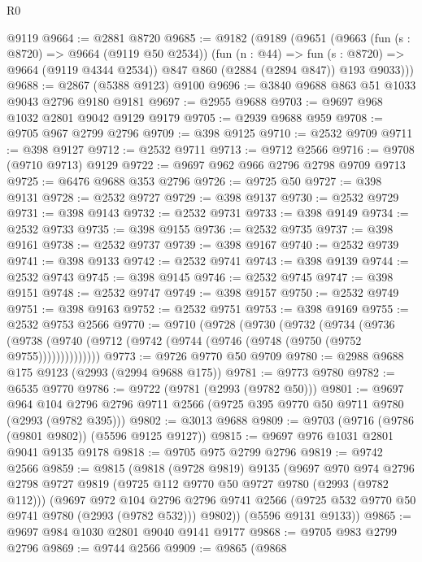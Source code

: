 \begin{lexlean}{R0}
\begin{coremodule}
    @9119
@9664 := @2881 @8720
@9685 := @9182
    (@9189
      (@9651
        (@9663
          (fun (s : @8720) => @9664 (@9119 @50 @2534))
          (fun (n : @44) => fun (s : @8720) => @9664 (@9119 @4344 @2534))
          @847
          @860
          (@2884 (@2894 @847))
          @193
          @9033)))
@9688 := @2867 (@5388 @9123) @9100
@9696 := @3840 @9688 @863 @51 @1033 @9043 @2796 @9180 @9181
@9697 := @2955 @9688
@9703 := @9697 @968 @1032 @2801 @9042 @9129 @9179
@9705 := @2939 @9688 @959
@9708 := @9705 @967 @2799 @2796
@9709 := @398 @9125
@9710 := @2532 @9709
@9711 := @398 @9127
@9712 := @2532 @9711
@9713 := @9712 @2566
@9716 := @9708 (@9710 @9713) @9129
@9722 := @9697 @962 @966 @2796 @2798 @9709 @9713
@9725 := @6476 @9688 @353 @2796
@9726 := @9725 @50
@9727 := @398 @9131
@9728 := @2532 @9727
@9729 := @398 @9137
@9730 := @2532 @9729
@9731 := @398 @9143
@9732 := @2532 @9731
@9733 := @398 @9149
@9734 := @2532 @9733
@9735 := @398 @9155
@9736 := @2532 @9735
@9737 := @398 @9161
@9738 := @2532 @9737
@9739 := @398 @9167
@9740 := @2532 @9739
@9741 := @398 @9133
@9742 := @2532 @9741
@9743 := @398 @9139
@9744 := @2532 @9743
@9745 := @398 @9145
@9746 := @2532 @9745
@9747 := @398 @9151
@9748 := @2532 @9747
@9749 := @398 @9157
@9750 := @2532 @9749
@9751 := @398 @9163
@9752 := @2532 @9751
@9753 := @398 @9169
@9755 := @2532 @9753 @2566
@9770 := @9710
    (@9728
      (@9730
        (@9732
          (@9734
            (@9736
              (@9738 (@9740 (@9712 (@9742 (@9744 (@9746 (@9748 (@9750 (@9752 @9755))))))))))))))
@9773 := @9726 @9770 @50 @9709
@9780 := @2988 @9688 @175 @9123 (@2993 (@2994 @9688 @175))
@9781 := @9773 @9780
@9782 := @6535 @9770
@9786 := @9722 (@9781 (@2993 (@9782 @50)))
@9801 := @9697
    @964
    @104
    @2796
    @2796
    @9711
    @2566
    (@9725 @395 @9770 @50 @9711 @9780 (@2993 (@9782 @395)))
@9802 := @3013 @9688
@9809 := @9703 (@9716 (@9786 (@9801 @9802)) (@5596 @9125 @9127))
@9815 := @9697 @976 @1031 @2801 @9041 @9135 @9178
@9818 := @9705 @975 @2799 @2796
@9819 := @9742 @2566
@9859 := @9815
    (@9818
      (@9728 @9819)
      @9135
      (@9697
        @970
        @974
        @2796
        @2798
        @9727
        @9819
        (@9725 @112 @9770 @50 @9727 @9780 (@2993 (@9782 @112)))
        (@9697
          @972
          @104
          @2796
          @2796
          @9741
          @2566
          (@9725 @532 @9770 @50 @9741 @9780 (@2993 (@9782 @532)))
          @9802))
      (@5596 @9131 @9133))
@9865 := @9697 @984 @1030 @2801 @9040 @9141 @9177
@9868 := @9705 @983 @2799 @2796
@9869 := @9744 @2566
@9909 := @9865
    (@9868

\end{coremodule}
\end{lexlean}
